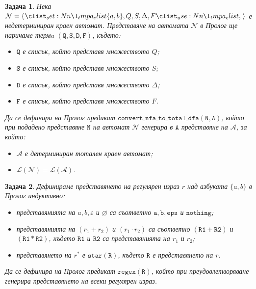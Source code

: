 \documentclass[12pt]{article}
\newcommand{\calA}{\mathcal{A}}
\newcommand{\calL}{\mathcal{L}}
\newcommand{\calN}{\mathcal{N}}
\newtheorem{problem}{Задача}
\theoremstyle{definition}
\theoremstyle{remark}
\begin{document}
\begin{problem}
Нека $\calN = \opair{\{ a, b \}, Q, S, \Delta, F}$ е недетерминиран краен автомат.
Представяне на автомата $\calN$ в Пролог ще наричаме термa $\mathtt{(Q, S, D, F)}$, където:
\begin{itemize}
    \item $\mathtt{Q}$ е списък, който представя множеството $Q$;
    \item $\mathtt{S}$ е списък, който представя множеството $S$;
    \item $\mathtt{D}$ е списък, който представя множеството $\Delta$;
    \item $\mathtt{F}$ е списък, който представя множеството $F$.
\end{itemize}
Да се дефинира на Пролог предикат $\mathtt{convert\_nfa\_to\_total\_dfa(N, A)}$, който при подадено представяне $\mathtt{N}$ на автомат $\calN$ генерира в $\mathtt{A}$ представяне на $\calA$, за който:
\begin{itemize}
    \item $\calA$ е детерминиран тотален краен автомат;
    \item $\calL(\calN) = \calL(\calA)$.
\end{itemize}
\end{problem}

\begin{problem}
Дефинираме представянето на регулярен израз $r$ над азбуката $\{ a, b \}$ в Пролог индуктивно:
\begin{itemize}
    \item представянията на $a, b, \varepsilon$ и $\varnothing$ са съответно $\mathtt{a, b, eps}$ и $\mathtt{nothing}$;
    \item представянията на $(r_1 + r_2)$ и $(r_1 \cdot r_2)$ са съответно $\mathtt{(R1 + R2)}$ и $\mathtt{(R1 * R2)}$, където $\mathtt{R1}$ и $\mathtt{R2}$ са представянията на $r_1$ и $r_2$;
    \item представянето на $r^*$ е $\mathtt{star(R)}$, където $\mathtt{R}$ е представянето на $r$.
\end{itemize}

Да се дефинира на Пролог предикат $\mathtt{regex(R)}$, който при преудовлетворяване генерира представянето на всеки регулярен израз.
\end{problem}
\end{document}

